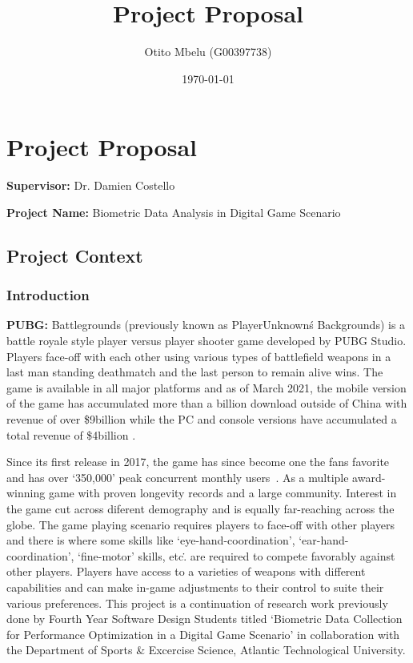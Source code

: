 \documentclass{report}
\title{Project Proposal}
\author{Otito Mbelu (G00397738)}
\date{\today}
\begin{document}
\setlength{\parindent}{0pt}
\maketitle

\chapter*{Project Proposal}
    \textbf{Supervisor:} Dr. Damien Costello \par
    \textbf{Project Name:} Biometric Data Analysis in Digital Game Scenario
    \section*{Project Context}
    \subsection*{Introduction}
    \par
    \textbf{PUBG:} Battlegrounds (previously known as PlayerUnknown\'s Backgrounds) is a battle royale style player versus
    player shooter game developed by PUBG Studio. Players face-off with each other using various types of battlefield weapons
    in a last man standing deathmatch and the last person to remain alive wins. The game is available in all major platforms
    and as of March 2021, the mobile version of the game has accumulated more than a billion download outside of China with 
    revenue of over \$9billion while the PC and console versions have accumulated a total revenue of \$4billion
    \cite{statista}.
    \par 
    Since its first release in 2017, the game has since become one the fans favorite and has over `350,000' peak concurrent 
    monthly users~\cite{statista}. As a multiple award-winning game with proven longevity records and a large community.
    Interest in the game cut across diferent demography and is equally far-reaching across the globe. 
    The game playing scenario requires players to face-off with other players and there is where some skills like 
    `eye-hand-coordination', `ear-hand-coordination', `fine-motor' skills, etc\.. are required to compete favorably against 
    other players. Players have access to a varieties of weapons with different capabilities and can make in-game adjustments
    to their control to suite their various preferences. 
    This project is a continuation of research work previously done by Fourth Year Software Design Students titled `Biometric 
    Data Collection for Performance Optimization in a Digital Game Scenario' in collaboration with the Department of Sports
     \& Excercise Science, Atlantic Technological University.
\end{document}
